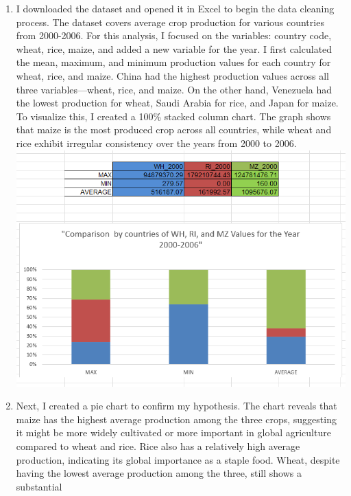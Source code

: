 \documentclass[
  letterpaper,
  DIV=11,
  numbers=noendperiod]{scrreprt}
\begin{document}
\begin{enumerate}
\def\labelenumi{\arabic{enumi}.}
\item
  I downloaded the dataset and opened it in Excel to begin the data
  cleaning process. The dataset covers average crop production for
  various countries from 2000-2006. For this analysis, I focused on the
  variables: country code, wheat, rice, maize, and added a new variable
  for the year. I first calculated the mean, maximum, and minimum
  production values for each country for wheat, rice, and maize. China
  had the highest production values across all three variables---wheat,
  rice, and maize. On the other hand, Venezuela had the lowest
  production for wheat, Saudi Arabia for rice, and Japan for maize. To
  visualize this, I created a 100\% stacked column chart. The graph
  shows that maize is the most produced crop across all countries, while
  wheat and rice exhibit irregular consistency over the years from 2000
  to 2006.
  \includegraphics{./Excel_1_Unit/Week1_Samuel/Screenshot (372).png}
\item
  Next, I created a pie chart to confirm my hypothesis. The chart
  reveals that maize has the highest average production among the three
  crops, suggesting it might be more widely cultivated or more important
  in global agriculture compared to wheat and rice. Rice also has a
  relatively high average production, indicating its global importance
  as a staple food. Wheat, despite having the lowest average production
  among the three, still shows a substantial

\end{enumerate}
\end{document}
